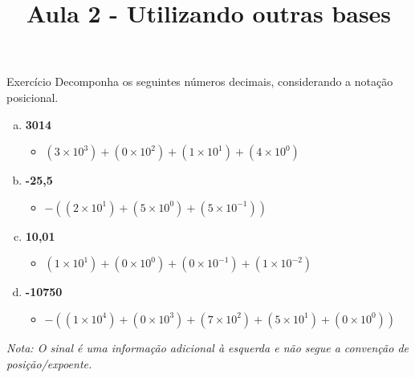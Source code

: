 \begin{frame}{Exercício}
    Decomponha os seguintes números decimais, considerando a notação posicional.




    \begin{enumerate}[a)]
        \item \textbf{3014}
              \begin{itemize}
                  \item $(3 \times 10^3) + (0 \times 10^2) + (1 \times 10^1) + (4 \times 10^0)$
              \end{itemize}

        \item \textbf{-25,5}
              \begin{itemize}
                  \item $-( (2 \times 10^1) + (5 \times 10^0) + (5 \times 10^{-1}) )$
              \end{itemize}

        \item \textbf{10,01}
              \begin{itemize}
                  \item $(1 \times 10^1) + (0 \times 10^0) + (0 \times 10^{-1}) + (1 \times 10^{-2})$
              \end{itemize}

        \item \textbf{-10750}
              \begin{itemize}
                  \item $-( (1 \times 10^4) + (0 \times 10^3) + (7 \times 10^2) + (5 \times 10^1) + (0 \times 10^0) )$
              \end{itemize}
    \end{enumerate}


    \textit{Nota: O sinal é uma informação adicional à esquerda e não segue a convenção de posição/expoente.}


\end{frame}


\title{Aula 2 - Utilizando outras bases}



\begin{frame}
    \titlepage
\end{frame}


